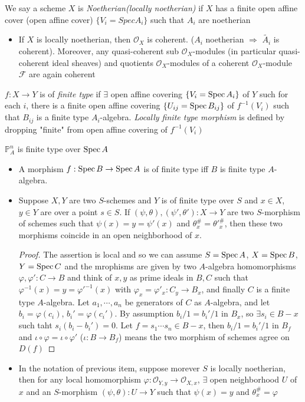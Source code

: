 \documentclass[main]{subfiles}
\begin{document}
\begin{definition}
We say a scheme $X$ is \textit{Noetherian(locally noetherian)} if $X$ has a finite open affine cover (open affine cover) $\{V_i=Spec A_i\}$ such that $A_i$ are noetherian
\end{definition}

\begin{itemize}
\item If $X$ is locally noetherian, then $\mathcal O_X$ is coherent. ($A_i$ noetherian $\Rightarrow$ $\widetilde{A_i}$ is coherent). Moreover, any quasi-coherent sub $\mathcal O_X$-modules (in particular quasi-coherent ideal sheaves) and quotients $\mathcal O_X$-modules of a coherent $\mathcal O_X$-module $\mathcal F$ are again coherent
\end{itemize}

\begin{definition}
$f:X\to Y$ is of \textit{finite type} if $\exists$ open affine covering $\{V_i=\operatorname{Spec} A_i\}$ of $Y$ such for each $i$, there is a finite open affine covering $\{U_{ij}=\operatorname{Spec} B_{ij}\}$ of $f^{-1}(V_i)$ such that $B_{ij}$ is a finite type $A_i$-algebra. \textit{Locally finite type morphism} is defined by dropping "finite" from open affine covering of $f^{-1}(V_i)$
\end{definition}

\begin{example}
$\mathbb P^n_A$ is finite type over $\operatorname{Spec} A$
\end{example}

\begin{itemize}
\item A morphism $f:\operatorname{Spec} B\to\operatorname{Spec} A$ is of finite type iff $B$ is finite type $A$-algebra.
\item Suppose $X,Y$ are two $S$-schemes and $Y$ is of finite type over $S$ and $x\in X$, $y\in Y$ are over a point $s\in S$. If $(\psi,\theta),(\psi',\theta'):X\to Y$ are two $S$-morphism of schemes such that $\psi(x)=y=\psi'(x)$ and $\theta^\#_x=\theta'^\#_x$, then these two morphisms coincide in an open neighborhood of $x$.
\begin{proof}
The assertion is local and so we can assume $S=\operatorname{Spec} A$, $X=\operatorname{Spec} B$, $Y=\operatorname{Spec} C$ and the mrophisms are given by two $A$-algebra homomorphisms $\varphi,\varphi':C\to B$ and think of $x,y$ as prime ideals in $B,C$ such that $\varphi^{-1}(x)=y=\varphi'^{-1}(x)$ with $\varphi_x=\varphi'_x:C_y\to B_x$, and finally $C$ is a finite type $A$-algebra. Let $a_1,\cdots,a_n$ be generators of $C$ as $A$-algebra, and let $b_i=\varphi(c_i)$, $b_i'=\varphi(c_i')$. By assumption $b_i/1=b_i'/1$ in $B_x$, so $\exists s_i\in B-x$ such taht $s_i(b_i-b_i')=0$. Let $f=s_1\cdots s_n\in B-x$, then $b_i/1=b_i'/1$ in $B_f$ and $\iota\circ\varphi=\iota\circ\varphi'$ ($\iota:B\to B_f$) means the two morphism of schemes agree on $D(f)$
\end{proof}
\item In the notation of previous item, suppose morever $S$ is locally noetherian, then for any local homomorphism $\varphi:\mathcal O_{Y,y}\to\mathcal O_{X,x}$, $\exists
$ open neighborhood $U$ of $x$ and an $S$-morphism $(\psi,\theta):U\to Y$ such that $\psi(x)=y$ and $\theta^\#_x=\varphi$
\end{itemize}
\end{document}
